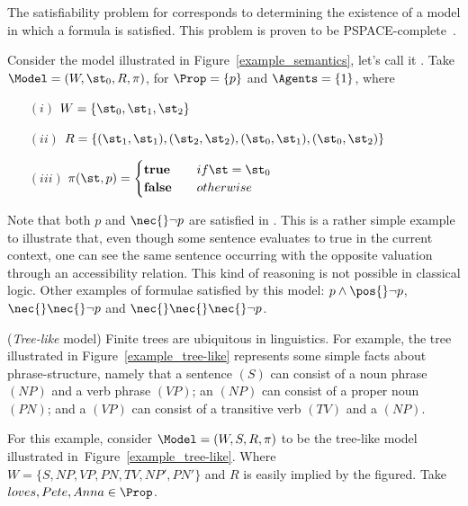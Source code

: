 The satisfiability problem for  corresponds to determining the
existence of a model in which a formula is satisfied. This problem is proven to be
PSPACE-complete~\cite{Spaan:coml}.

\begin{example}
    Consider the model illustrated in Figure~\ref{example_semantics}, let's call
    it \Model. Take $\Model = (W, \st_0, R, \pi)$, for $\Prop = \{p\}$ and
    $\Agents = \{1\}$, where 
    \begin{enumerate}
        \item[$(i)$] $W = \{\st_0, \st_1, \st_2\}$
        \item[$(ii)$] $R = \{(\st_1, \st_1), (\st_2, \st_2),
            (\st_0, \st_1), (\st_0, \st_2)\}$
        \item[$(iii)$] $ \pi(\st, p) = 
            \begin{cases} 
                \text{\textbf{true}}    & \quad if \st = \st_0\\
                \text{\textbf{false}}   & \quad otherwise
            \end{cases}
                       $
    \end{enumerate}

    Note that both $p$ and $\nec{} \neg p$ are satisfied in \Model. This is a
    rather simple example to illustrate that, even though some sentence
    evaluates to true in the current context, one can see the same sentence
    occurring with the opposite valuation through an accessibility relation.
    This kind of reasoning is not possible in classical logic. Other examples of
    formulae satisfied by this model: $p \land \pos{} \neg p$, $\nec{}\nec{}
    \neg p$ and $\nec{} \nec {} \nec{} \neg p$.
\end{example}



\begin{example}
    (\emph{Tree-like} model) 
    Finite trees are ubiquitous in linguistics. For example, the tree
    illustrated in Figure~\ref{example_tree-like} represents some simple facts
    about phrase-structure, namely that a sentence $(S)$ can consist of a noun
    phrase $(NP)$ and a verb phrase $(VP)$; an $(NP)$ can consist of a proper
    noun $(PN)$; and a $(VP)$ can consist of a transitive verb $(TV)$ and a
    $(NP)$.

    For this example, consider $\Model = (W, S, R, \pi)$ to be the tree-like
    model illustrated in~Figure~\ref{example_tree-like}. Where $W = \{S, NP, VP,
    PN, TV, NP', PN'\}$ and $R$ is easily implied by the figured.
    Take $loves, Pete, Anna \in \Prop$.
\end{example}

